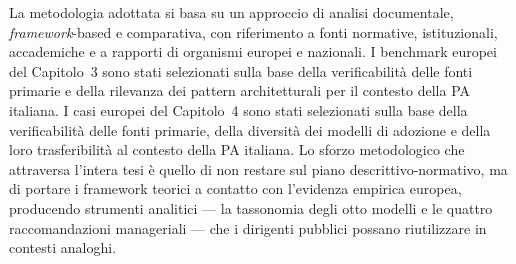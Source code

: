 La metodologia adottata si basa su un approccio di analisi documentale, \textit{framework}-based e comparativa, con riferimento a fonti normative, istituzionali, accademiche e a rapporti di organismi europei e nazionali. I benchmark europei del Capitolo~3 sono stati selezionati sulla base della verificabilità delle fonti primarie e della rilevanza dei pattern architetturali per il contesto della PA italiana. I casi europei del Capitolo~4 sono stati selezionati sulla base della verificabilità delle fonti primarie, della diversità dei modelli di adozione e della loro trasferibilità al contesto della PA italiana. Lo sforzo metodologico che attraversa l'intera tesi è quello di non restare sul piano descrittivo-normativo, ma di portare i framework teorici a contatto con l'evidenza empirica europea, producendo strumenti analitici --- la tassonomia degli otto modelli e le quattro raccomandazioni manageriali --- che i dirigenti pubblici possano riutilizzare in contesti analoghi.
